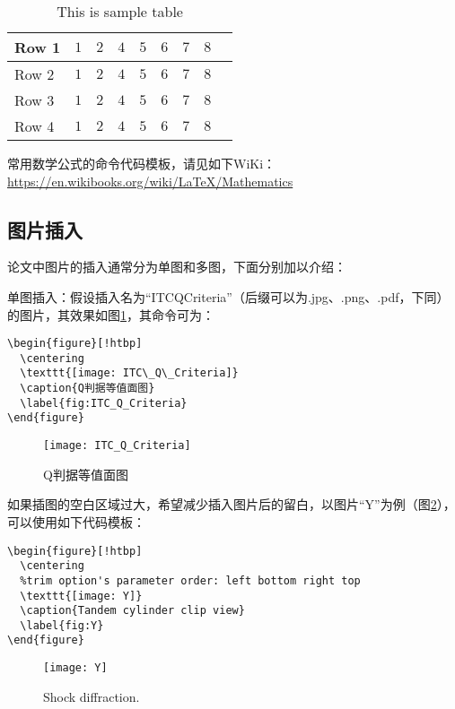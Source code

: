 \begin{table}[!htbp]
    \centering
    \renewcommand{\arraystretch}{1.2}
    \begin{tabular}{lcccccccc}
        \hline\hline
        Row 1 & $1$ & $2$ & $4$ & $5$ & $6$ & $7$ & $8$\\
        \hline
        Row 2 & $1$ & $2$ & $4$ & $5$ & $6$ & $7$ & $8$\\
        \hline
        Row 3 & $1$ & $2$ & $4$ & $5$ & $6$ & $7$ & $8$\\
        \hline
        Row 4 & $1$ & $2$ & $4$ & $5$ & $6$ & $7$ & $8$\\
        \hline\hline
    \end{tabular}
    \caption{This is sample table}
    \label{tab:sample}
\end{table}

常用数学公式的命令代码模板，请见如下WiKi：\url{https://en.wikibooks.org/wiki/LaTeX/Mathematics}

\subsection{图片插入}

论文中图片的插入通常分为单图和多图，下面分别加以介绍：

单图插入：假设插入名为“ITC\textunderscore Q\textunderscore Criteria”（后缀可以为.jpg、.png、.pdf，下同）的图片，其效果如图\ref{fig:ITC_Q_Criteria}，其命令可为：
\begin{verbatim}
\begin{figure}[!htbp]
  \centering
  \texttt{[image: ITC\_Q\_Criteria]}
  \caption{Q判据等值面图}
  \label{fig:ITC_Q_Criteria}
\end{figure}
\end{verbatim}
\begin{figure}[!htbp]
  \centering
  \texttt{[image: ITC\_Q\_Criteria]}
  \caption{Q判据等值面图}
  \label{fig:ITC_Q_Criteria}
\end{figure}

如果插图的空白区域过大，希望减少插入图片后的留白，以图片“Y”为例（图\ref{fig:Y}），可以使用如下代码模板：
\begin{verbatim}
\begin{figure}[!htbp]
  \centering
  %trim option's parameter order: left bottom right top
  \texttt{[image: Y]}
  \caption{Tandem cylinder clip view}
  \label{fig:Y}
\end{figure}
\end{verbatim}
\begin{figure}[!htbp]
  \centering
  \texttt{[image: Y]}
  \caption{Shock diffraction.}
  \label{fig:Y}
\end{figure}

